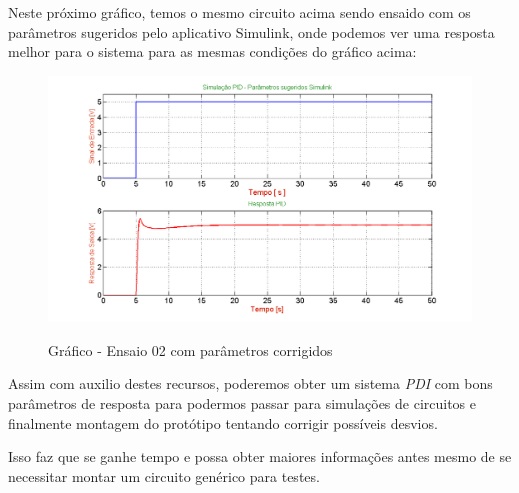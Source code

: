 Neste próximo gráfico, temos o mesmo circuito acima sendo ensaido com os parâmetros sugeridos pelo aplicativo Simulink, onde podemos ver uma resposta melhor para o sistema para as mesmas condições do gráfico acima:

\begin{figure}[H]
		\centering
		\includegraphics[width=0.9\linewidth]{./ima/GrafRegulado1.png}
		\label{fig:fluxo1}
		\caption{Gráfico - Ensaio 02 com parâmetros corrigidos}
	\end{figure}
	
Assim com auxilio destes recursos, poderemos obter um sistema \emph{PDI} com bons parâmetros de resposta para podermos passar para simulações de circuitos e finalmente montagem do protótipo tentando corrigir possíveis desvios. 

Isso faz que se ganhe tempo e possa obter maiores informações antes mesmo de se necessitar montar um circuito genérico para testes.

